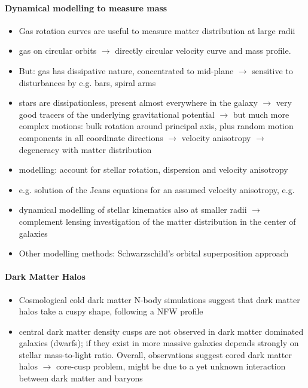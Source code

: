 \paragraph{Dynamical modelling to measure mass}
\begin{itemize}
\item Gas rotation curves are useful to measure matter distribution at large radii
\item gas on circular orbits $\longrightarrow$ directly circular velocity curve and mass profile. 
\item But: gas has dissipative nature, concentrated to mid-plane $\longrightarrow$ sensitive to disturbances by e.g. bars, spiral arms
\item stars are dissipationless, present almost everywhere in the galaxy $\longrightarrow$ very good tracers of the underlying gravitational potential $\longrightarrow$  but much more complex motions: bulk rotation around principal axis, plus random motion components in all coordinate directions $\longrightarrow$ velocity anisotropy $\longrightarrow$ degeneracy with matter distribution 
\item modelling: account for stellar rotation, dispersion and velocity anisotropy
\item e.g. solution of the Jeans equations for an assumed velocity anisotropy, e.g. \citet{Cap08}
\item dynamical modelling of stellar kinematics also at smaller radii $\longrightarrow$ complement lensing investigation of the matter distribution in the center of galaxies
\item Other modelling methods: Schwarzschild's orbital superposition approach \citep{schwarzschild}
\end{itemize}

\paragraph{Dark Matter Halos}
\begin{itemize}
\item Cosmological cold dark matter N-body simulations suggest that dark matter halos take a cuspy shape, following a NFW profile \citep{NFW96}
\item central dark matter density cusps are not observed in dark matter dominated galaxies (dwarfs); if they exist in more massive galaxies depends strongly on stellar mass-to-light ratio. Overall, observations suggest cored dark matter halos $\longrightarrow$ core-cusp problem, might be due to a yet unknown interaction between dark matter and baryons
\end{itemize}

